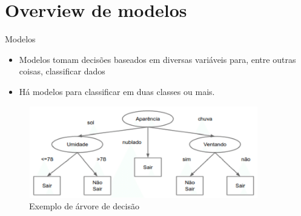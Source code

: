 \section{Overview de modelos}

\begin{frame}	
	\begin{block}{Modelos}	
		\begin{itemize}
			\item Modelos tomam decisões baseados em diversas variáveis para, entre outras coisas, classificar dados
			\item Há modelos para classificar em duas classes ou mais.
		\end{itemize}			
		\begin{figure}[!htb]
			\centering	  				
			\includegraphics[height=4cm, width = 10cm]{./pic/arvore.png}
			\caption{Exemplo de árvore de decisão}
			\label{fig_Arvore}
		\end{figure}	
	\end{block}
\end{frame}